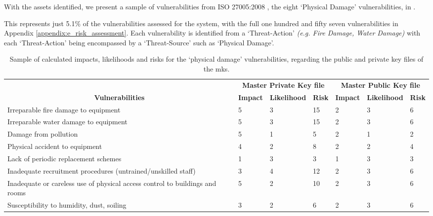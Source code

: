 With the assets identified, we present a sample of vulnerabilities from ISO 27005:2008 \citep{ISO2008}, the eight `Physical Damage' vulnerabilities, in .

This represents just 5.1\% of the vulnerabilities assessed for the \theResServer system, with the full one hundred and fifty seven vulnerabilities in Appendix \ref{appendix:e_risk_assessment}. Each vulnerability is identified from a `Threat-Action' \textit{(e.g. Fire Damage, Water Damage)} with each `Threat-Action' being encompassed by a `Threat-Source' such as `Physical Damage'.

\begin{table}[htp]
  \begin{tabularx}{\linewidth}{Xllllll}
    \rowcolor[HTML]{9BC1E6}
    \multicolumn{1}{c}{\cellcolor[HTML]{8497B0}} & \multicolumn{3}{c}{\cellcolor[HTML]{9BC1E6}\textbf{Master Private Key file}} & \multicolumn{3}{c}{\cellcolor[HTML]{9BC1E6}\textbf{Master Public Key file}} \\
    \multicolumn{1}{c}{\multirow{-2}{*}{\cellcolor[HTML]{8497B0}\textbf{Vulnerabilities}}} & \cellcolor[HTML]{D87B79}\textbf{Impact} & \cellcolor[HTML]{C6E0B4}\textbf{Likelihood} & \cellcolor[HTML]{8EA9DB}\textbf{Risk} & \cellcolor[HTML]{D87B79}\textbf{Impact} & \cellcolor[HTML]{C6E0B4}\textbf{Likelihood} & \cellcolor[HTML]{8EA9DB}\textbf{Risk} \\
    \cellcolor[HTML]{A9D08E}Irreparable fire damage to equipment & 5 & 3 & \cellcolor[HTML]{FDBB7B}15 & 2 & 3 & \cellcolor[HTML]{A3C37C}6 \\
    \rowcolor[HTML]{EFEFEF}
    \cellcolor[HTML]{A9D08E}Irreparable water damage to equipment & 5 & 3 & \cellcolor[HTML]{FDBB7B}15 & 2 & 3 & \cellcolor[HTML]{A3C37C}6 \\
    \cellcolor[HTML]{A9D08E}Damage from pollution & 5 & 1 & \cellcolor[HTML]{96C27C}5 & 2 & 1 & \cellcolor[HTML]{6FBF7B}2 \\
    \rowcolor[HTML]{EFEFEF}
    \cellcolor[HTML]{A9D08E}Physical accident to equipment & 4 & 2 & \cellcolor[HTML]{BCC57C}8 & 2 & 2 & \cellcolor[HTML]{88C17B}4 \\
    \cellcolor[HTML]{A9D08E}Lack of periodic replacement schemes & 1 & 3 & \cellcolor[HTML]{7CC07B}3 & 1 & 3 & \cellcolor[HTML]{7CC07B}3 \\
    \rowcolor[HTML]{EFEFEF}
    \cellcolor[HTML]{A9D08E}Inadequate recruitment procedures (untrained/unskilled staff) & 3 & 4 & \cellcolor[HTML]{F0C97D}12 & 2 & 3 & \cellcolor[HTML]{A3C37C}6 \\
    \cellcolor[HTML]{A9D08E}Inadequate or careless use of physical access control to buildings and rooms & 5 & 2 & \cellcolor[HTML]{D6C77D}10 & 2 & 3 & \cellcolor[HTML]{A3C37C}6 \\
    \rowcolor[HTML]{EFEFEF}
    \cellcolor[HTML]{A9D08E}Susceptibility to humidity, dust, soiling & 3 & 2 & \cellcolor[HTML]{A3C37C}6 & 2 & 3 & \cellcolor[HTML]{A3C37C}6
  \end{tabularx}
  \caption{Sample of calculated impacts, likelihoods and risks for the `physical damage' vulnerabilities, regarding the public and private key files of the \acrfull{mks}.}
  \label{tab:example_vulns_risks}
\end{table}

